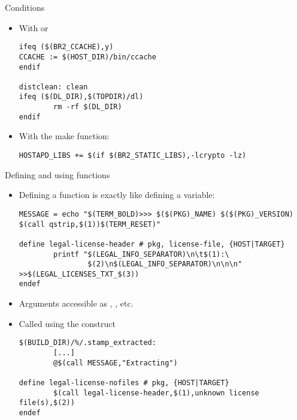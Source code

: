 \begin{frame}[fragile]{Conditions}
  \begin{itemize}
  \item With  or 
    \begin{block}{}
\begin{verbatim}
ifeq ($(BR2_CCACHE),y)
CCACHE := $(HOST_DIR)/bin/ccache
endif

distclean: clean
ifeq ($(DL_DIR),$(TOPDIR)/dl)
        rm -rf $(DL_DIR)
endif
\end{verbatim}
    \end{block}
  \item With the  make function:
    \begin{block}{}
\begin{verbatim}
HOSTAPD_LIBS += $(if $(BR2_STATIC_LIBS),-lcrypto -lz)
\end{verbatim}
    \end{block}
  \end{itemize}
\end{frame}

\begin{frame}[fragile]{Defining and using functions}
  \begin{itemize}
  \item Defining a function is exactly like defining a variable:
    \begin{block}{}
\begin{verbatim}
MESSAGE = echo "$(TERM_BOLD)>>> $($(PKG)_NAME) $($(PKG)_VERSION) $(call qstrip,$(1))$(TERM_RESET)"

define legal-license-header # pkg, license-file, {HOST|TARGET}
        printf "$(LEGAL_INFO_SEPARATOR)\n\t$(1):\
                $(2)\n$(LEGAL_INFO_SEPARATOR)\n\n\n" >>$(LEGAL_LICENSES_TXT_$(3))
endef
\end{verbatim}
    \end{block}
  \item Arguments accessible as , , etc.
  \item Called using the  construct
    \begin{block}{}
\begin{verbatim}
$(BUILD_DIR)/%/.stamp_extracted:
        [...]
        @$(call MESSAGE,"Extracting")

define legal-license-nofiles # pkg, {HOST|TARGET}
        $(call legal-license-header,$(1),unknown license file(s),$(2))
endef
\end{verbatim}
    \end{block}
  \end{itemize}
\end{frame}

